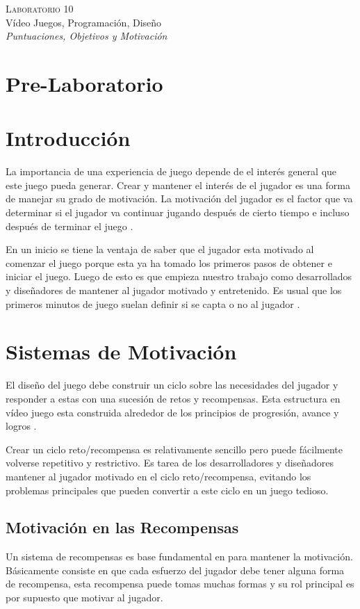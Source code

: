 \begin{center}
\textsc{\Large Laboratorio 10}~\\
{\large Vídeo Juegos, Programación, Diseño}~\\
\emph{Puntuaciones, Objetivos y Motivación}
\end{center}

\section{Pre-Laboratorio}

\section{Introducción}
La importancia de una experiencia de juego depende de el interés general que este juego pueda generar. Crear y mantener el interés de el jugador es una forma de manejar su grado de motivación. La motivación del jugador es el factor que va determinar si el jugador va continuar jugando después de cierto tiempo e incluso después de terminar el juego \cite[p.~75]{jenkinscreatinggames}.

En un inicio se tiene la ventaja de saber que el jugador esta motivado al comenzar el juego porque esta ya ha tomado los primeros pasos de obtener e iniciar el juego. Luego de esto es que empieza nuestro trabajo como desarrollados y diseñadores de mantener al jugador motivado y entretenido. Es usual que los primeros minutos de juego suelan definir si se capta o no al jugador \cite{motivationdesign}.
\section{Sistemas de Motivación}
El diseño del juego debe construir un ciclo sobre las necesidades del jugador y responder a estas con una sucesión de retos y recompensas. Esta estructura en vídeo juego esta construida alrededor de los principios de progresión, avance y logros \cite{motivationdesign}.

Crear un ciclo reto/recompensa es relativamente sencillo pero puede fácilmente volverse repetitivo y restrictivo. Es tarea de los desarrolladores y diseñadores mantener al jugador motivado en el ciclo reto/recompensa, evitando los problemas principales que pueden convertir a este ciclo en un juego tedioso.
\subsection{Motivación en las Recompensas}
Un sistema de recompensas es base fundamental en para mantener la motivación. Básicamente consiste en que cada esfuerzo del jugador debe tener alguna forma de recompensa, esta recompensa puede tomas muchas formas y su rol principal es por supuesto que motivar al jugador.


